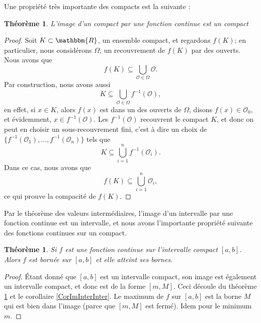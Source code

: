\documentclass[a4paper,12pt]{book}
\newcommand{\eR}{\mathbbm{R}}
\newcounter{numtho}
\theoremstyle{mes_exemples}	\newtheorem{exemple}[numtho]{Exemple}
\theoremstyle{mes_tho}
\newtheorem{theorem}[numtho]{Théorème}
\newcommand{\mO}{\mathcal{O}}
\begin{document}
Une propriété très importante des compacts est la suivante :
\begin{theorem}		\label{ThoImCompCotComp}
L'image d'un compact par une fonction continue est un compact
\end{theorem}

\begin{proof}
	Soit $K\subset \eR$, un ensemble compact, et regardons $f(K)$; en particulier, nous considérons $\Omega$, un recouvrement de $f(K)$ par des ouverts. Nous avons que
	\begin{equation}
		f(K)\subseteq\bigcup_{\mO\in\Omega}\mO.
	\end{equation}
	Par construction, nous avons aussi
	\begin{equation}
		K\subseteq\bigcup_{\mO\in\Omega}f^{-1}(\mO),
	\end{equation}
	en effet, si $x\in K$, alors $f(x)$ est dans un des ouverts de $\Omega$, disons $f(x)\in \mO_0$, et évidemment, $x\in f^{-1}(\mO)$.  Les $f^{-1}(\mO)$ recouvrent le compact $K$, et donc on peut en choisir un sous-recouvrement fini, c'est à dire un choix de $\{ f^{-1}(\mO_1),\ldots,f^{-1}(\mO_n) \}$ tels que
	\begin{equation}
		K\subseteq \bigcup_{i=1}^nf^{-1}(\mO_i).
	\end{equation}
	Dans ce cas, nous avons que
	\begin{equation}
		f(K)\subseteq\bigcup_{i=1}^n\mO_i,
	\end{equation}
	ce qui prouve la compacité de $f(K)$.
\end{proof}

Par le théorème des valeurs intermédiaires, l'image d'un intervalle par une fonction continue est un intervalle, et nous avons l'importante propriété suivante des fonctions continues sur un compact.

\begin{theorem}
	Si $f$ est une fonction continue sur l'intervalle compact $[a,b]$. Alors $f$ est bornée sur $[a,b]$ et elle atteint ses bornes.
\end{theorem}

\begin{proof}
	Étant donné que $[a,b]$ est un intervalle compact, son image est également un intervalle compact, et donc est de la forme $[m,M]$. Ceci découle du théorème \ref{ThoImCompCotComp} et le corollaire \ref{CorImInterInter}. Le maximum de $f$ sur $[a,b]$ est la borne $M$ qui est bien dans l'image (parce que $[m,M]$ est fermé). Idem pour le minimum $m$.
\end{proof}
\end{document}
